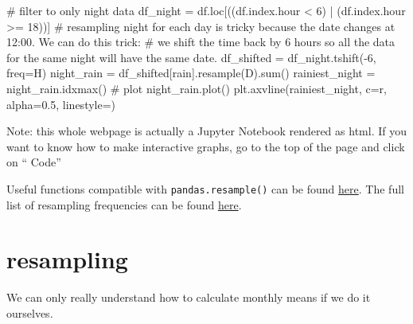 \documentclass[
  letterpaper,
  DIV=11,
  numbers=noendperiod,
  oneside]{scrreprt}
\newenvironment{Shaded}{\begin{snugshade}}{\end{snugshade}}
\newcommand{\BuiltInTok}[1]{\textcolor[rgb]{0.00,0.23,0.31}{#1}}
\newcommand{\CommentTok}[1]{\textcolor[rgb]{0.37,0.37,0.37}{#1}}
\newcommand{\DecValTok}[1]{\textcolor[rgb]{0.68,0.00,0.00}{#1}}
\newcommand{\FloatTok}[1]{\textcolor[rgb]{0.68,0.00,0.00}{#1}}
\newcommand{\NormalTok}[1]{\textcolor[rgb]{0.00,0.23,0.31}{#1}}
\newcommand{\OperatorTok}[1]{\textcolor[rgb]{0.37,0.37,0.37}{#1}}
\newcommand{\StringTok}[1]{\textcolor[rgb]{0.13,0.47,0.30}{#1}}
\begin{document}
\begin{tcolorbox}
\begin{Shaded}
\begin{Highlighting}[]
\CommentTok{\# filter to only night data}
\NormalTok{df\_night }\OperatorTok{=}\NormalTok{ df.loc[((df.index.hour }\OperatorTok{\textless{}} \DecValTok{6}\NormalTok{) }\OperatorTok{|}\NormalTok{ (df.index.hour }\OperatorTok{\textgreater{}=} \DecValTok{18}\NormalTok{))]}
\CommentTok{\# resampling night for each day is tricky because the date changes at 12:00. We can do this trick:}
\CommentTok{\# we shift the time back by 6 hours so all the data for the same night will have the same date.}
\NormalTok{df\_shifted }\OperatorTok{=}\NormalTok{ df\_night.tshift(}\OperatorTok{{-}}\DecValTok{6}\NormalTok{, freq}\OperatorTok{=}\StringTok{\textquotesingle{}H\textquotesingle{}}\NormalTok{)}
\NormalTok{night\_rain }\OperatorTok{=}\NormalTok{ df\_shifted[}\StringTok{\textquotesingle{}rain\textquotesingle{}}\NormalTok{].resample(}\StringTok{\textquotesingle{}D\textquotesingle{}}\NormalTok{).}\BuiltInTok{sum}\NormalTok{()}
\NormalTok{rainiest\_night }\OperatorTok{=}\NormalTok{ night\_rain.idxmax()}
\CommentTok{\# plot}
\NormalTok{night\_rain.plot()}
\NormalTok{plt.axvline(rainiest\_night, c}\OperatorTok{=}\StringTok{\textquotesingle{}r\textquotesingle{}}\NormalTok{, alpha}\OperatorTok{=}\FloatTok{0.5}\NormalTok{, linestyle}\OperatorTok{=}\StringTok{\textquotesingle{}{-}{-}\textquotesingle{}}\NormalTok{)}
\end{Highlighting}
\end{Shaded}

\end{tcolorbox}

Note: this whole webpage is actually a Jupyter Notebook rendered as
html. If you want to know how to make interactive graphs, go to the top
of the page and click on `` Code''

Useful functions compatible with \texttt{pandas.resample()} can be found
\href{https://pandas.pydata.org/docs/reference/resampling.html\#computations-descriptive-stats}{here}.
The full list of resampling frequencies can be found
\href{https://pandas.pydata.org/pandas-docs/version/0.12.0/timeseries.html\#offset-aliases}{here}.

\hypertarget{resampling-1}{%
\chapter{resampling}\label{resampling-1}}

We can only really understand how to calculate monthly means if we do it
ourselves.
\end{document}
